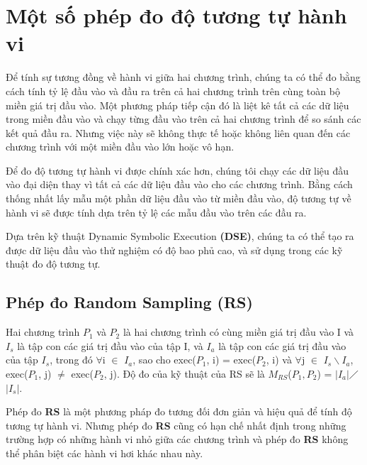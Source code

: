 \section{Một số phép đo độ tương tự hành vi}

Để tính sự tương đồng về hành vi giữa hai chương trình, chúng ta có
thể đo bằng cách tính tỷ lệ đầu vào và đầu ra trên cả hai chương trình
trên cùng toàn bộ miền giá trị đầu vào. Một phương pháp tiếp cận đó là
liệt kê tất cả các dữ liệu trong miền đầu vào và chạy từng đầu vào
trên cả hai chương trình để so sánh các kết quả đầu ra. Nhưng việc này
sẽ không thực tế hoặc không liên quan đến các chương trình với một
miền đầu vào lớn hoặc vô hạn.
	
Để đo độ tương tự hành vi được chính xác hơn, chúng tôi chạy các dữ
liệu đầu vào đại diện thay vì tất cả các dữ liệu đầu vào cho các
chương trình. Bằng cách thống nhất lấy mẫu một phần dữ liệu đầu vào từ
miền đầu vào, độ tương tự về hành vi sẽ được tính dựa trên tỷ lệ các
mẫu đầu vào trên các đầu ra.
	
Dựa trên kỹ thuật Dynamic Symbolic Execution \textbf{(DSE)}, chúng ta có thể tạo ra được dữ liệu đầu vào thử nghiệm có độ bao phủ cao, và sử dụng trong các kỹ thuật đo độ tương tự. \\

\subsection{Phép đo Random Sampling (RS)}


\begin{definition}
  Hai chương trình $P_{1}$ và $P_{2}$ là hai chương trình có cùng miền
  giá trị đầu vào I và $I_{s}$ là tập con các giá trị đầu vào của tập
  I, và $I_{a}$ là tập con các giá trị đầu vào của tập $I_{s}$, trong
  đó $\forall$i $\in$ $I_{a}$, sao cho exec($P_{1}$, i) =
  exec($P_{2}$, i) và $\forall$j $\in$ $I_{s} \backslash I_{a}$,
  exec($P_{1}$, j) $\neq$ exec($P_{2}$, j). Độ đo của kỹ thuật của RS
  sẽ là $M_{RS}$($P_{1},P_{2}$) =
  $\left|I_{a}\right|$$\diagup$$\left|I_{s}\right|$.
\end{definition}

	
Phép đo \textbf{RS} là một phương pháp đo tương đối đơn giản và hiệu quả để tính độ tương tự hành vi. Nhưng phép đo \textbf{RS} cũng có hạn chế nhất định trong những trường hợp có những hành vi nhỏ giữa các chương trình và phép đo \textbf{RS } không thể phân biệt các hành vi hơi khác nhau này.
	

